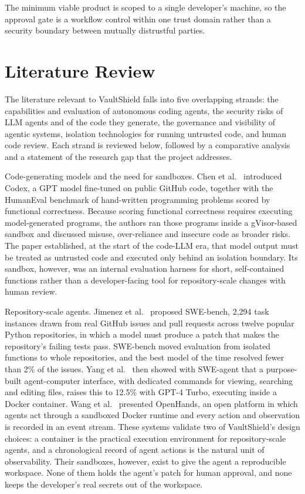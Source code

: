 \documentclass[12pt,a4paper,oneside]{report}
\begin{document}
The minimum viable product is scoped to a single developer's machine, so the approval gate is a workflow control within one trust domain rather than a security boundary between mutually distrustful parties.

\clearpage

\chapter{Literature Review}\label{literature-review}

The literature relevant to VaultShield falls into five overlapping strands: the capabilities and evaluation of autonomous coding agents, the security risks of LLM agents and of the code they generate, the governance and visibility of agentic systems, isolation technologies for running untrusted code, and human code review. Each strand is reviewed below, followed by a comparative analysis and a statement of the research gap that the project addresses.

Code-generating models and the need for sandboxes. Chen et al.~\cite{ref1} introduced Codex, a GPT model fine-tuned on public GitHub code, together with the HumanEval benchmark of hand-written programming problems scored by functional correctness. Because scoring functional correctness requires executing model-generated programs, the authors ran those programs inside a gVisor-based sandbox and discussed misuse, over-reliance and insecure code as broader risks. The paper established, at the start of the code-LLM era, that model output must be treated as untrusted code and executed only behind an isolation boundary. Its sandbox, however, was an internal evaluation harness for short, self-contained functions rather than a developer-facing tool for repository-scale changes with human review.

Repository-scale agents. Jimenez et al.~\cite{ref2} proposed SWE-bench, 2,294 task instances drawn from real GitHub issues and pull requests across twelve popular Python repositories, in which a model must produce a patch that makes the repository's failing tests pass. SWE-bench moved evaluation from isolated functions to whole repositories, and the best model of the time resolved fewer than 2\% of the issues. Yang et al.~\cite{ref3} then showed with SWE-agent that a purpose-built agent-computer interface, with dedicated commands for viewing, searching and editing files, raises this to 12.5\% with GPT-4 Turbo, executing inside a Docker container. Wang et al.~\cite{ref4} presented OpenHands, an open platform in which agents act through a sandboxed Docker runtime and every action and observation is recorded in an event stream. These systems validate two of VaultShield's design choices: a container is the practical execution environment for repository-scale agents, and a chronological record of agent actions is the natural unit of observability. Their sandboxes, however, exist to give the agent a reproducible workspace. None of them holds the agent's patch for human approval, and none keeps the developer's real secrets out of the workspace.
\end{document}
